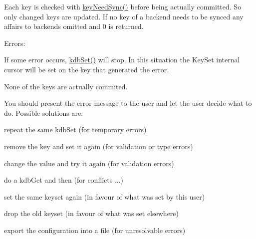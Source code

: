 Each key is checked with \hyperlink{group__keytest_gaf247df0de7aca04b32ef80e39ef12950}{key\-Need\-Sync()} before being actually committed. So only changed keys are updated. If no key of a backend needs to be synced any affairs to backends omitted and 0 is returned.

\begin{DoxyParagraph}{Errors\-:}

\end{DoxyParagraph}
If some error occurs, \hyperlink{group__kdb_ga11436b058408f83d303ca5e996832bcf}{kdb\-Set()} will stop. In this situation the Key\-Set internal cursor will be set on the key that generated the error.

None of the keys are actually commited.

You should present the error message to the user and let the user decide what to do. Possible solutions are\-:
\begin{DoxyItemize}
\item repeat the same kdb\-Set (for temporary errors)
\item remove the key and set it again (for validation or type errors)
\item change the value and try it again (for validation errors)
\item do a kdb\-Get and then (for conflicts ...)
\begin{DoxyItemize}
\item set the same keyset again (in favour of what was set by this user)
\item drop the old keyset (in favour of what was set elsewhere)
\end{DoxyItemize}
\item export the configuration into a file (for unresolvable errors)
\end{DoxyItemize}

